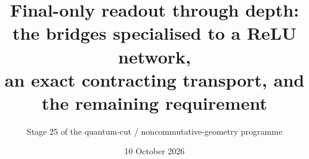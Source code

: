 \documentclass[11pt]{amsart}
\title[Final-only readout through depth]{Final-only readout through depth:\\ the bridges specialised to a ReLU network,\\ an exact contracting transport, and the remaining requirement}
\author{Stage 25 of the quantum-cut / noncommutative-geometry programme}
\date{10 October 2026}
\theoremstyle{definition}
\theoremstyle{remark}
\begin{document}
\sloppy

\end{document}
